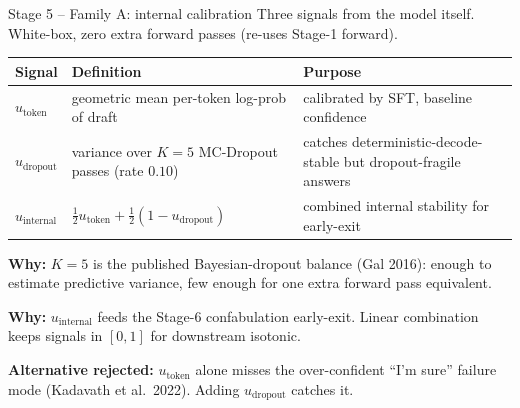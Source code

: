 \documentclass[10pt,aspectratio=169]{beamer}
\newcommand{\why}[1]{{\color{caemamber}\textbf{Why:}} #1}
\newcommand{\altn}[1]{{\color{caemred}\textbf{Alternative rejected:}} #1}
\begin{document}
\begin{frame}{Stage 5 -- Family A: internal calibration}
  \scriptsize
  Three signals from the model itself. White-box, zero extra forward passes (re-uses Stage-1 forward).

  \vspace{0.3em}
  \begin{tabular}{@{}lp{4.5cm}p{5cm}@{}}
    \toprule
    Signal & Definition & Purpose \\
    \midrule
    $u_{\text{token}}$ & geometric mean per-token log-prob of draft & calibrated by SFT, baseline confidence \\
    $u_{\text{dropout}}$ & variance over $K=5$ MC-Dropout passes (rate $0.10$) & catches deterministic-decode-stable but dropout-fragile answers \\
    $u_{\text{internal}}$ & $\tfrac{1}{2}u_{\text{token}} + \tfrac{1}{2}(1{-}u_{\text{dropout}})$ & combined internal stability for early-exit \\
    \bottomrule
  \end{tabular}

  \vspace{0.4em}
  \why{$K=5$ is the published Bayesian-dropout balance (Gal 2016): enough to estimate predictive variance, few enough for one extra forward pass equivalent.}

  \why{$u_{\text{internal}}$ feeds the Stage-6 confabulation early-exit. Linear combination keeps signals in $[0,1]$ for downstream isotonic.}

  \altn{$u_{\text{token}}$ alone misses the over-confident ``I'm sure'' failure mode (Kadavath et al.\ 2022). Adding $u_{\text{dropout}}$ catches it.}
\end{frame}
\end{document}
